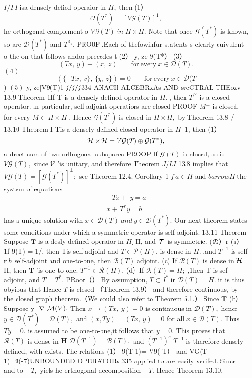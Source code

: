 $\textstyle I\!\!\!/I\,I$ isa densely defied operaior in $\textstyle H,$ then (1） $$ {\mathcal{O}}(T^{*})=[V{\mathcal{G}}(T)]^{1}, $$ he orthogonal complement o $V{\mathcal{G}}(T)\;i n\;H\times H.$ Note that once ${\mathcal{G}}(T^{\ast})$ is known, so are ${\mathcal{D}}(T^{\ast})$ and $T^{\aleph_{\star}}.$ PRO0F .Each of thefowinfur statents s clearly euivulent o the on that follows andor precedes t (2） {y, z}e 9(T*） (3） $$ (T x,\,y)-(x,\,z)\qquad{\mathrm{for~every~}}x\in{\mathcal{D}}(T). $$ $(4)$ $$ (\{-T x,\,x\},\,\{y,\,z\})=0\qquad{\mathrm{for~every~}}x\in{\mathcal{D}}(T $$ ) $({\mathcal{5}})$ {y, z}e[V9(T)1 ${\it j}/{\it j}/{\it j}$334 ANACH ALCEBRxAs AND srcCTRAL THEoxv 13.9 Theorem 1If T is a densely defined operator in $\textstyle H.$ , then $T^{\cong}$ is a closed operator. ln particular, self-adjoint operatiors are closed PROOF $M^{\perp}$ is closed, for every $M\subset H\times H$ . Hence ${\mathcal{G}}(T^{*})$ is closed in $H\times H,$ by Theorem 13.8 / 13.10 Theorem I Tis a densely defined closed operator in $\textstyle H_{\cdot}$ 1, then (1） $$ {\cal H}\times{\cal H}=V{\mathcal G}(T)\oplus{\mathcal G}(T^{*}), $$ a drect sum of two orlhogonal subspaces PROOP If ${\mathcal{G}}(T)$ is closed, so is $V{\mathcal{G}}(T),$ since ${\mathcal{V}}$ 'is unitary, and therefore Theorem $J/I\!J$ 13.8 implies that $V{\mathcal{G}}(T)=[{\mathcal{G}}(T^{*})]^{\perp};$ see Theorem 12.4. Corollary 1 $f\,a\in H$ and $b arrow H$ the system of equations $$ \begin{array}{c}{{-T x+\;y=a}}\\ {{x+\,T^{*}y=b}}\end{array} $$ has a unique solution with $x\in{\mathcal{D}}(T)\;a n d\;y\in{\mathcal{D}}(T^{*}).$ Our next theorem states some conditions under which a symmetric operator is self-adjoint. 13.11 Theorem Supposc ${\boldsymbol{T}}$ is a desly defined operaior in $\textstyle H_{\cdot}$ H, and ${\cal T}\,$ is symmetric. (の）r (a）1f 9(T) = 1/, then Tis self-adjoinl and $T\in{\mathcal{P}}(H).$ is dense in $\textstyle H.$ ,and $T^{-1}$ is self ${\boldsymbol{r}}\,h$ self-adjoint and one-to-one, then ${\mathcal{R}}(T)$ adjoint. (c) If ${\mathcal{R}}(T)$ is dense in ${\cal H}$ H, then ${\boldsymbol{T}}$ 'is one-to-one. $T^{-1}\in{\mathcal{R}}(H).$ (d）If ${\mathcal{R}}(T)=H;$ ,1hen T is sef-adjoint, and $T=T^{*}.$ PRoor（） By assumption, $T\subset I^{*}$ ir ${\mathcal{D}}(T)=H.$ it is thus obyious that Hcncc ${\mathbf{}}T$ is closed （Theorem 13.9） and therefore continuous, by the closed graph theorem.（We could also refer to Theorem 5.1.） Since ${\boldsymbol{T}}$ (b） Suppose y $\mathrm{\boldmath~\nabla~}\mathcal{M}(V).$ Then $x\to(T x,\;y)=0$ is continuous in ${\mathcal{D}}(T),$ hence $y\in{\mathcal{D}}(T^{*})={\mathcal{D}}(T),$ and $(x,T y)=(T x,\,y)=0$ for all $x\in{\mathcal{D}}(T).$ Thus $T y=0.$ is assumed to be one-to-one,it follows that $y=0.$ This proves that ${\mathcal{R}}(T)$ is dense in ${\boldsymbol{H}}$ $\mathcal{D}(T^{-1})=\mathcal{B}(T),$ and $(T^{-1})^{s}$ $T^{-1}$ is therefore densely defined, with exists. The relations (1） 9(T-1)= V9(-T） and VG(T-1)=9(-7)UNBOUNDED OPERATORs 335 applied to are easily verifed. Since and to $-T,$ yiels he orthogonal decomposition $-T.$ Hence Theorem 13.10, 